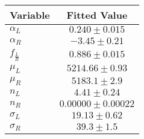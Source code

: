 \begin{tabular}[t]{lc}
\hline
Variable &Fitted Value\\
\hline\hline
$\alpha_L$&$0.240\pm0.015$\\
\hline
$\alpha_R$&$-3.45\pm0.21$\\
\hline
$f_{\frac{L}{R}}$&$0.886\pm0.015$\\
\hline
$\mu_L$&$5214.66\pm0.93$\\
\hline
$\mu_R$&$5183.1\pm2.9$\\
\hline
$n_L$&$4.41\pm0.24$\\
\hline
$n_R$&$0.00000\pm0.00022$\\
\hline
$\sigma_L$&$19.13\pm0.62$\\
\hline
$\sigma_R$&$39.3\pm1.5$\\
\hline
\end{tabular}